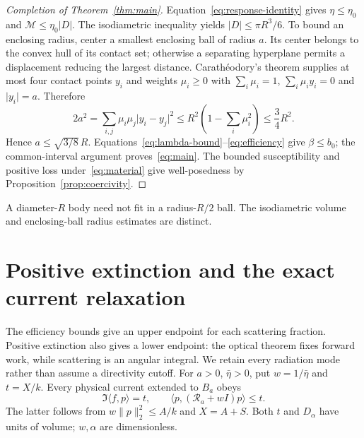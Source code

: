 \documentclass[11pt]{article}
\newcommand{\ip}[2]{\langle #1,#2\rangle}
\newcommand{\norm}[1]{\lVert #1\rVert}
\newcommand{\abs}[1]{\lvert #1\rvert}
\begin{document}
\begin{proof}[Completion of Theorem~\ref{thm:main}]
Equation~\eqref{eq:response-identity} gives $\eta\leq\eta_0$ and $\mathcal M\leq\eta_0\abs D$. The isodiametric inequality yields $\abs D\leq\pi R^3/6$. To bound an enclosing radius, center a smallest enclosing ball of radius $a$. Its center belongs to the convex hull of its contact set; otherwise a separating hyperplane permits a displacement reducing the largest distance. Carath\'eodory's theorem supplies at most four contact points $y_i$ and weights $\mu_i\geq0$ with $\sum_i\mu_i=1$, $\sum_i\mu_iy_i=0$ and $\abs{y_i}=a$. Therefore
\[
 2a^2=\sum_{i,j}\mu_i\mu_j\abs{y_i-y_j}^2
 \leq R^2\left(1-\sum_i\mu_i^2\right)\leq\frac34R^2.
\]
Hence $a\leq\sqrt{3/8}\,R$. Equations~\eqref{eq:lambda-bound}--\eqref{eq:efficiency} give $\beta\leq b_0$; the common-interval argument proves~\eqref{eq:main}. The bounded susceptibility and positive loss under~\eqref{eq:material} give well-posedness by Proposition~\ref{prop:coercivity}.
\end{proof}
A diameter-$R$ body need not fit in a radius-$R/2$ ball. The isodiametric volume and enclosing-ball radius estimates are distinct.

\section{Positive extinction and the exact current relaxation}\label{sec:resolvent}
The efficiency bounds give an upper endpoint for each scattering fraction. Positive extinction also gives a lower endpoint: the optical theorem fixes forward work, while scattering is an angular integral. We retain every radiation mode rather than assume a directivity cutoff. For $a>0$, $\bar\eta>0$, put $w=1/\bar\eta$ and $t=X/k$. Every physical current extended to $B_a$ obeys
\begin{equation}\label{eq:relaxation}
 \Im\ip f p=t,\qquad
 \ip p{(\mathcal R_a+wI)p}\leq t.
\end{equation}
The latter follows from $w\norm p_2^2\leq A/k$ and $X=A+S$. Both $t$ and $D_\alpha$ have units of volume; $w,\alpha$ are dimensionless.
\end{document}
